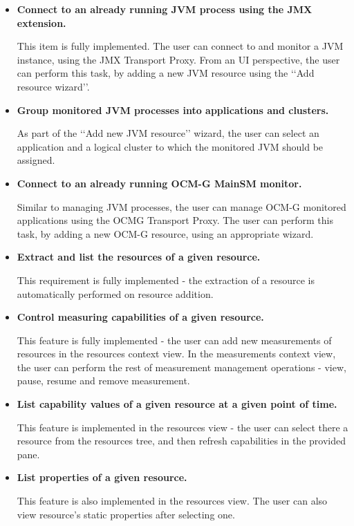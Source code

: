 \begin{itemize}

\item {\bf Connect to an already running JVM process using the JMX extension.}

This item is fully implemented. The user can connect to and monitor a JVM instance, using the JMX Transport Proxy. From an UI perspective, the user can perform this task, by adding a new JVM resource using the \lq\lq{}Add resource wizard\rq\rq{}.

\item {\bf Group monitored JVM processes into applications and clusters.}

As part of the \lq\lq{}Add new JVM resource\rq\rq{} wizard, the user can select an application and a logical cluster to which the monitored JVM should be assigned.

\item {\bf Connect to an already running OCM-G MainSM monitor.}

Similar to managing JVM processes, the user can manage OCM-G monitored applications using the OCMG Transport Proxy. The user can perform this task, by adding a new OCM-G resource, using an appropriate wizard.

\item {\bf Extract and list the resources of a given resource.}

This requirement is fully implemented - the extraction of a resource is automatically performed on resource addition.

\item {\bf Control measuring capabilities of a given resource.}

This feature is fully implemented - the user can add new measurements of resources in the resources context view. In the measurements context view, the user can perform the rest of measurement management operations - view, pause, resume and remove measurement.

\item {\bf List capability values of a given resource at a given point of time.}

This feature is implemented in the resources view - the user can select there a resource from the resources tree, and then refresh capabilities in the provided pane.

\item {\bf List properties of a given resource.}

This feature is also implemented in the resources view. The user can also view resource\rq{}s static properties after selecting one.


\end{itemize}
